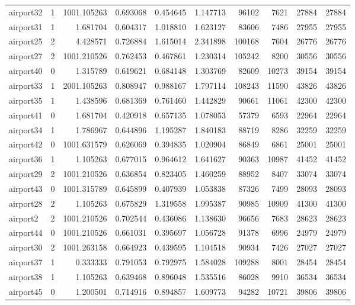 \begin{longtable}{|l|r|r|r|r|r|r|r|r|r|}
airport32 & 1 & 1001.105263 & 0.693068 & 0.454645 & 1.147713 & 96102 & 7621 & 27884 & 27884 \\
airport31 & 1 & 1.681704 & 0.604317 & 1.018810 & 1.623127 & 83606 & 7486 & 27955 & 27955 \\
airport25 & 2 & 4.428571 & 0.726884 & 1.615014 & 2.341898 & 100168 & 7604 & 26776 & 26776 \\
airport27 & 2 & 1001.210526 & 0.762453 & 0.467861 & 1.230314 & 105242 & 8200 & 30556 & 30556 \\
airport40 & 0 & 1.315789 & 0.619621 & 0.684148 & 1.303769 & 82609 & 10273 & 39154 & 39154 \\
airport33 & 1 & 2001.105263 & 0.808947 & 0.988167 & 1.797114 & 108243 & 11590 & 43826 & 43826 \\
airport35 & 1 & 1.438596 & 0.681369 & 0.761460 & 1.442829 & 90661 & 11061 & 42300 & 42300 \\
airport41 & 0 & 1.681704 & 0.420918 & 0.657135 & 1.078053 & 57379 & 6593 & 22964 & 22964 \\
airport34 & 1 & 1.786967 & 0.644896 & 1.195287 & 1.840183 & 88719 & 8286 & 32259 & 32259 \\
airport42 & 0 & 1001.631579 & 0.626069 & 0.394835 & 1.020904 & 86849 & 6861 & 25001 & 25001 \\
airport36 & 1 & 1.105263 & 0.677015 & 0.964612 & 1.641627 & 90363 & 10987 & 41452 & 41452 \\
airport29 & 2 & 1001.210526 & 0.636854 & 0.823405 & 1.460259 & 88952 & 8407 & 33074 & 33074 \\
airport43 & 0 & 1001.315789 & 0.645899 & 0.407939 & 1.053838 & 87326 & 7499 & 28093 & 28093 \\
airport28 & 2 & 1.105263 & 0.675829 & 1.319558 & 1.995387 & 90985 & 10909 & 41300 & 41300 \\
airport2 & 2 & 1001.210526 & 0.702544 & 0.436086 & 1.138630 & 96656 & 7683 & 28623 & 28623 \\
airport44 & 0 & 1001.210526 & 0.661031 & 0.395697 & 1.056728 & 91378 & 6996 & 24979 & 24979 \\
airport30 & 2 & 1001.263158 & 0.664923 & 0.439595 & 1.104518 & 90934 & 7426 & 27027 & 27027 \\
airport37 & 1 & 0.333333 & 0.791053 & 0.792975 & 1.584028 & 109288 & 8001 & 28454 & 28454 \\
airport38 & 1 & 1.105263 & 0.639468 & 0.896048 & 1.535516 & 86028 & 9910 & 36534 & 36534 \\
airport45 & 0 & 1.200501 & 0.714916 & 0.894857 & 1.609773 & 94282 & 10721 & 39806 & 39806 \\

\end{longtable}
